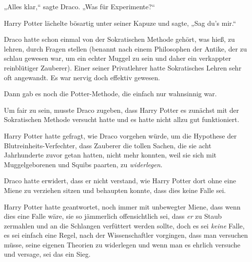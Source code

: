 „Alles klar,“ sagte Draco. „Was für Experimente?“

Harry Potter lächelte bösartig unter seiner Kapuze und sagte, „Sag du's mir.“

\later

Draco hatte schon einmal von der Sokratischen Methode gehört, was hieß, zu lehren, durch Fragen stellen (benannt nach einem Philosophen der Antike, der zu schlau gewesen war, um ein echter Muggel zu sein und daher ein verkappter reinblütiger Zauberer). Einer seiner Privatlehrer hatte Sokratisches Lehren sehr oft angewandt. Es war nervig doch effektiv gewesen.

Dann gab es noch die Potter-Methode, die einfach nur wahnsinnig war.

Um fair zu sein, musste Draco zugeben, dass Harry Potter es zunächst mit der Sokratischen Methode versucht hatte und es hatte nicht allzu gut funktioniert.

Harry Potter hatte gefragt, wie Draco vorgehen würde, um die Hypothese der Blutreinheits-Verfechter, dass Zauberer die tollen Sachen, die sie acht Jahrhunderte zuvor getan hatten, nicht mehr konnten, weil sie sich mit Muggelgeborenen und Squibs paarten, zu \emph{widerlegen}.

Draco hatte erwidert, dass er nicht verstand, wie Harry Potter dort ohne eine Miene zu verziehen sitzen und behaupten konnte, dass dies keine Falle sei.

Harry Potter hatte geantwortet, noch immer mit unbewegter Miene, dass wenn dies eine Falle wäre, sie so jämmerlich offensichtlich sei, dass \emph{er} zu Staub zermahlen und an die Schlangen verfüttert werden sollte, doch es sei \emph{keine} Falle, es sei einfach eine Regel, nach der Wissenschaftler vorgingen, dass man versuchen müsse, seine eigenen Theorien zu widerlegen und wenn man es ehrlich versuche und versage, sei das ein Sieg.

